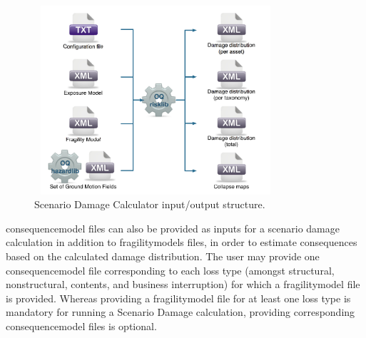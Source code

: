 \begin{figure}[ht]
\centering
\includegraphics[width=9cm,height=7cm]{figures/risk/io-structure-scenario-damage.pdf}
\caption{Scenario Damage Calculator input/output structure.}
\label{fig:io-structure-scenario-damage}
\end{figure}

\gls{consequencemodel} files can also be
provided as inputs for a scenario damage calculation in addition to
\glspl{fragilitymodel} files, in order to estimate consequences based on the
calculated damage distribution. The user may provide one
\gls{consequencemodel} file corresponding to each loss type (amongst
structural, nonstructural, contents, and business interruption) for which a
\gls{fragilitymodel} file is provided. Whereas providing a
\gls{fragilitymodel} file for at least one loss type is mandatory for running
a Scenario Damage calculation, providing corresponding \gls{consequencemodel}
files is optional.
